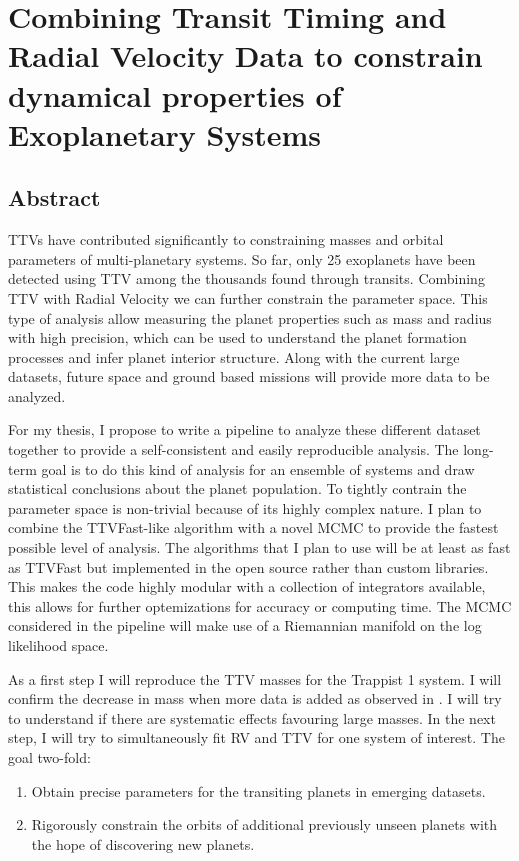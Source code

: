 \section{Combining Transit Timing and Radial Velocity Data to constrain dynamical properties of Exoplanetary Systems}

\subsection{Abstract}
TTVs have contributed significantly to constraining masses and orbital parameters of multi-planetary systems.
So far, only 25 exoplanets have been detected using TTV among the thousands found through transits.
Combining TTV with Radial Velocity we can further constrain the parameter space.
This type of analysis allow  measuring the planet properties such as mass and radius with high precision, which can be used to understand the planet formation processes and infer planet interior structure. 
Along with the current large datasets, future space and ground based missions will provide more data to be analyzed.

For my thesis, I propose to write a pipeline to analyze these different dataset together to provide a self-consistent and easily reproducible analysis. 
The long-term goal is to do this kind of analysis for an ensemble of systems and draw statistical conclusions about the planet population.
To tightly contrain the parameter space is non-trivial because of its highly complex nature.
I plan to combine the TTVFast-like algorithm with a novel MCMC to provide the fastest possible level of analysis.
The algorithms that I plan to use will be at least as fast as TTVFast but implemented in the open source \reb rather than custom libraries.
This makes the code highly modular with a collection of integrators available, this allows for further optemizations for accuracy or computing time.
The MCMC considered in the pipeline will make use of a Riemannian manifold on the log likelihood space.

As a first step I will reproduce the TTV masses for the Trappist 1 system. 
I will confirm the decrease in mass when more data is added as observed in \cite{1704.04290}.
I will try to understand if there are systematic effects favouring large masses.
In the next step, I will try to simultaneously fit RV and TTV for one system of interest. 
The goal two-fold:
\begin{enumerate} 
	\item Obtain precise parameters for the transiting planets in emerging datasets.
	\item Rigorously constrain the orbits of additional previously unseen planets with the hope of discovering new planets.
\end{enumerate}